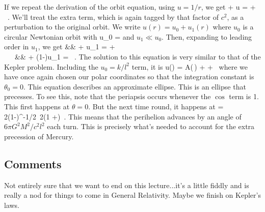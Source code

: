 \para
{\co If we repeat the derivation of the orbit equation, using $u=1/r$, we get
%
\be {} + u = + \ .\label{orbitforku}\ee
%
}
We'll treat the extra term, which is again tagged by that factor of $c^2$, as a perturbation to the original orbit. {\co We write $u(r) = u_0+ u_1(r)$ where $u_0$ is  a circular Newtonian orbit with
%
\be  u_0 = \ee
%
and $u_1 \ll u_0$. Then, expanding to leading order in $u_1$, we get 
%
\be && + u_1 =  +  \nn\\ \Longrightarrow\ \ \ &&  + \left(1-\right)u_1 = \ .\ee
%
}
The solution to this equation is very similar to that of the Kepler problem. Including the $u_0=k/l^2$ term, {\co it is
%
\be u(\theta) = A\cos\left(\,\theta\right) +  +\ \ee
%
}  where we have once again chosen our polar coordinates so that the integration constant is $\theta_0=0$.  This equation  describes an approximate ellipse. {\co This is an ellipse that precesses.  To see this, note that the periapsis occurs whenever the $\cos$ term is 1. This first happens at $\theta=0$. But the next time round, it happens at
%
\be \theta = 2\pi\left(1-\right)^{-1/2}\approx\ 2\pi\left(1 +\right)\ .\label{periprecess}\ee
%
This means that the perihelion advances by an angle of $6\pi G^2M^2/c^2l^2$ each turn. This is precisely what's needed to account for the extra  precession of Mercury. }



\subsection*{Comments}

{\cblue Not entirely sure that we want to end on this lecture...it's a little fiddly and is really a nod for things to come in General Relativity. Maybe we finish on Kepler's laws. }









